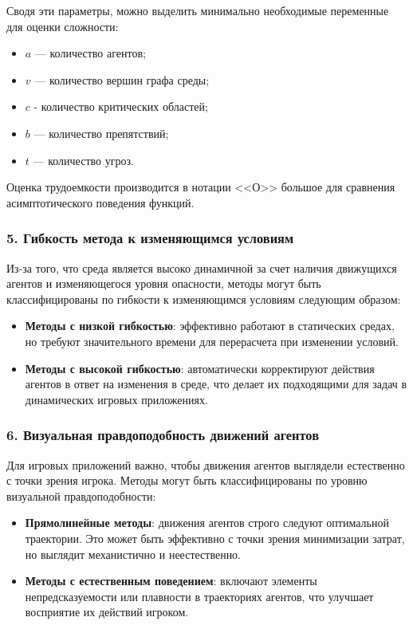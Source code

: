 Сводя эти параметры, можно выделить минимально необходимые переменные для оценки сложности: 
\begin{itemize}
	\item $a$ — количество агентов;
	\item $v$ — количество вершин графа среды;
	\item $c$ - количество критических областей;
	\item $b$ — количество препятствий;
	\item $t$ — количество угроз.
\end{itemize}

Оценка трудоемкости производится в нотации <<О>> большое для сравнения асимптотического поведения функций.

\subsubsection*{5. Гибкость метода к изменяющимся условиям}

Из-за того, что среда является высоко динамичной за счет наличия движущихся агентов и изменяющегося уровня опасности, методы могут быть классифицированы по гибкости к изменяющимся условиям следующим образом:
\begin{itemize}
	\item \textbf{Методы с низкой гибкостью}: эффективно работают в статических средах, но требуют значительного времени для перерасчета при изменении условий.  
	\item \textbf{Методы с высокой гибкостью}: автоматически корректируют действия агентов в ответ на изменения в среде, что делает их подходящими для задач в динамических игровых приложениях.
\end{itemize}

\subsubsection*{6. Визуальная правдоподобность движений агентов}

Для игровых приложений важно, чтобы движения агентов выглядели естественно с точки зрения игрока.
Методы могут быть классифицированы по уровню визуальной правдоподобности:
\begin{itemize}
	\item \textbf{Прямолинейные методы}: движения агентов строго следуют оптимальной траектории.
	Это может быть эффективно с точки зрения минимизации затрат, но выглядит механистично и неестественно.  
	\item \textbf{Методы с естественным поведением}: включают элементы непредсказуемости или плавности в траекториях агентов, что улучшает восприятие их действий игроком.
\end{itemize}

